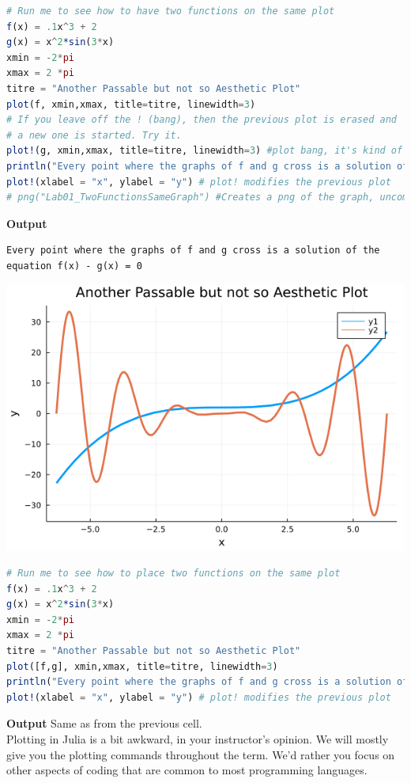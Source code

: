 \begin{lstlisting}[language=Julia,style=mystyle]
# Run me to see how to have two functions on the same plot
f(x) = .1x^3 + 2
g(x) = x^2*sin(3*x) 
xmin = -2*pi
xmax = 2 *pi
titre = "Another Passable but not so Aesthetic Plot"
plot(f, xmin,xmax, title=titre, linewidth=3) 
# If you leave off the ! (bang), then the previous plot is erased and
# a new one is started. Try it.
plot!(g, xmin,xmax, title=titre, linewidth=3) #plot bang, it's kind of joyous!
println("Every point where the graphs of f and g cross is a solution of the equation f(x) - g(x) = 0")
plot!(xlabel = "x", ylabel = "y") # plot! modifies the previous plot
# png("Lab01_TwoFunctionsSameGraph") #Creates a png of the graph, uncomment to use
\end{lstlisting}
\textbf{Output} 
\begin{verbatim}
Every point where the graphs of f and g cross is a solution of the equation f(x) - g(x) = 0
\end{verbatim}
	\begin{center}
\includegraphics[width=0.5\columnwidth]{graphics/Chap02/Lab01_TwoFunctionsSameGraph.png}
\end{center}

\begin{lstlisting}[language=Julia,style=mystyle]
# Run me to see how to place two functions on the same plot
f(x) = .1x^3 + 2
g(x) = x^2*sin(3*x) 
xmin = -2*pi
xmax = 2 *pi
titre = "Another Passable but not so Aesthetic Plot"
plot([f,g], xmin,xmax, title=titre, linewidth=3) 
println("Every point where the graphs of f and g cross is a solution of the equation f(x) - g(x) = 0")
plot!(xlabel = "x", ylabel = "y") # plot! modifies the previous plot
\end{lstlisting}
\textbf{Output}   Same as from the previous cell.\\

Plotting in Julia is a bit awkward, in your instructor's opinion. We will mostly give you the plotting commands throughout the term. We'd rather you focus on other aspects of coding that are common to most programming languages. \\

